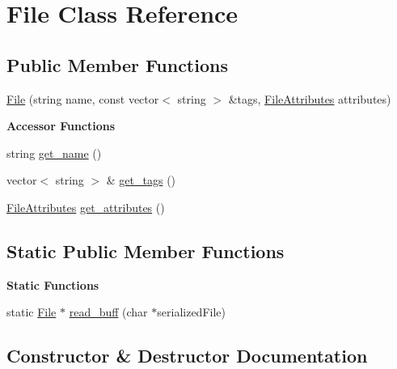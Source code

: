 \hypertarget{classFile}{}\section{File Class Reference}
\label{classFile}
\subsection*{Public Member Functions}
\begin{DoxyCompactItemize}
\item 
\mbox{\hyperlink{classFile_af29e498f601951f4ccf06f2fc3fb1f73}{File}} (string name, const vector$<$ string $>$ \&tags, \mbox{\hyperlink{structfile__attributes}{File\+Attributes}} attributes)
\end{DoxyCompactItemize}
\begin{Indent}\textbf{ Accessor Functions}\par
\begin{DoxyCompactItemize}
\item 
string \mbox{\hyperlink{classFile_a4b8e86f4fae0219744cf82f6bab35b53}{get\+\_\+name}} ()
\item 
vector$<$ string $>$ \& \mbox{\hyperlink{classFile_a479270bfe1fa436d317151ac108eb28a}{get\+\_\+tags}} ()
\item 
\mbox{\hyperlink{structfile__attributes}{File\+Attributes}} \mbox{\hyperlink{classFile_a9f59d3d546e8e574889558d63c71bf02}{get\+\_\+attributes}} ()
\end{DoxyCompactItemize}
\end{Indent}
\subsection*{Static Public Member Functions}
\begin{Indent}\textbf{ Static Functions}\par
\begin{DoxyCompactItemize}
\item 
static \mbox{\hyperlink{classFile}{File}} $\ast$ \mbox{\hyperlink{classFile_abd409818fbd7f3a2319f2b27a62c8ccd}{read\+\_\+buff}} (char $\ast$serialized\+File)
\end{DoxyCompactItemize}
\end{Indent}


\subsection{Constructor \& Destructor Documentation}
\mbox{\label{classFile_af29e498f601951f4ccf06f2fc3fb1f73}} 
